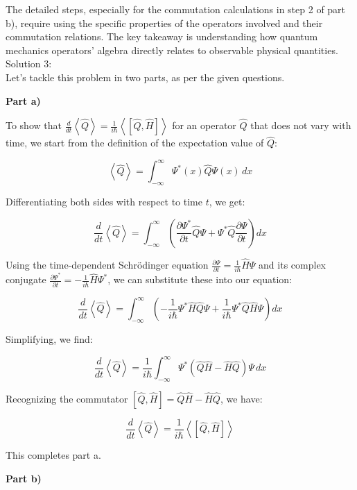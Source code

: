 \documentclass[a4paper,11pt]{article}
\begin{document}
The detailed steps, especially for the commutation calculations in step 2 of part b), require using the specific properties of the operators involved and their commutation relations. The key takeaway is understanding how quantum mechanics operators' algebra directly relates to observable physical quantities. \\

\noindent Solution 3: \\

Let's tackle this problem in two parts, as per the given questions.

\textbf{Part a)}

To show that \(\frac{d}{dt}\left<\hat{Q}\right> = \frac{1}{i\hbar}\left< \left[ \hat{Q}, \hat{H} \right] \right>\) for an operator \(\hat{Q}\) that does not vary with time, we start from the definition of the expectation value of \(\hat{Q}\):

\[
\left<\hat{Q}\right> = \int_{-\infty}^{\infty} \Psi^{*}(x) \hat{Q} \Psi(x) \, dx
\]

Differentiating both sides with respect to time \(t\), we get:

\[
\frac{d}{dt}\left<\hat{Q}\right> = \int_{-\infty}^{\infty} \left( \frac{\partial \Psi^{*}}{\partial t} \hat{Q} \Psi + \Psi^{*} \hat{Q} \frac{\partial \Psi}{\partial t} \right) dx
\]

Using the time-dependent Schrödinger equation \(\frac{\partial\Psi}{\partial t} = \frac{1}{i\hbar}\hat{H}\Psi\) and its complex conjugate \(\frac{\partial\Psi^{*}}{\partial t} = -\frac{1}{i\hbar}\hat{H}\Psi^{*}\), we can substitute these into our equation:

\[
\frac{d}{dt}\left<\hat{Q}\right> = \int_{-\infty}^{\infty} \left( -\frac{1}{i\hbar} \Psi^{*} \hat{H} \hat{Q} \Psi + \frac{1}{i\hbar} \Psi^{*} \hat{Q} \hat{H} \Psi \right) dx
\]

Simplifying, we find:

\[
\frac{d}{dt}\left<\hat{Q}\right> = \frac{1}{i\hbar} \int_{-\infty}^{\infty} \Psi^{*} \left( \hat{Q} \hat{H} - \hat{H} \hat{Q} \right) \Psi \, dx
\]

Recognizing the commutator \(\left[ \hat{Q}, \hat{H} \right] = \hat{Q} \hat{H} - \hat{H} \hat{Q}\), we have:

\[
\frac{d}{dt}\left<\hat{Q}\right> = \frac{1}{i\hbar}\left< \left[ \hat{Q}, \hat{H} \right] \right>
\]

This completes part a.

\textbf{Part b)}
\end{document}
